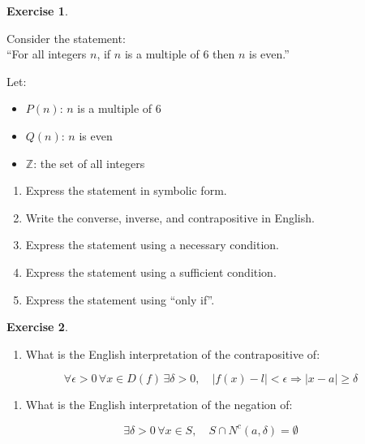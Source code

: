 \documentclass[
]{book}
\providecommand{\tightlist}{%
  \setlength{\itemsep}{0pt}\setlength{\parskip}{0pt}}
\theoremstyle{definition}
\theoremstyle{definition}
\theoremstyle{definition}
\newtheorem{exercise}{Exercise}[chapter]
\theoremstyle{definition}
\theoremstyle{remark}
\begin{document}
\begin{exercise}
\protect\hypertarget{exr:unnamed-chunk-138}{}\label{exr:unnamed-chunk-138}

Consider the statement:\\
``For all integers \(n\), if \(n\) is a multiple of 6 then \(n\) is even.''

Let:

\begin{itemize}
\tightlist
\item
  \(P(n)\): \(n\) is a multiple of 6\\
\item
  \(Q(n)\): \(n\) is even\\
\item
  \(\mathbb{Z}\): the set of all integers
\end{itemize}

\begin{enumerate}
\def\labelenumi{(\roman{enumi})}
\tightlist
\item
  Express the statement in symbolic form.\\
\item
  Write the converse, inverse, and contrapositive in English.\\
\item
  Express the statement using a necessary condition.\\
\item
  Express the statement using a sufficient condition.\\
\item
  Express the statement using ``only if''.
\end{enumerate}

\end{exercise}

\begin{exercise}
\protect\hypertarget{exr:unnamed-chunk-139}{}\label{exr:unnamed-chunk-139}\leavevmode

\begin{enumerate}
\def\labelenumi{(\roman{enumi})}
\tightlist
\item
  What is the English interpretation of the contrapositive of:
\end{enumerate}

\[
\forall \epsilon > 0 \, \forall x \in D(f) \, \exists \delta > 0, \quad |f(x) - l| < \epsilon \Rightarrow |x - a| \geq \delta
\]

\begin{enumerate}
\def\labelenumi{(\roman{enumi})}
\setcounter{enumi}{1}
\tightlist
\item
  What is the English interpretation of the negation of:
\end{enumerate}

\[
\exists \delta > 0 \, \forall x \in S, \quad S \cap N^c(a, \delta) = \emptyset
\]

\end{exercise}
\end{document}
